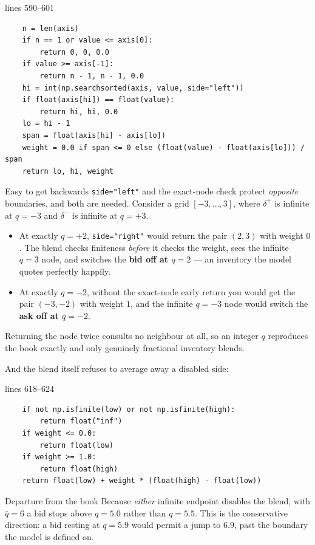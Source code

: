 \documentclass[11pt,a4paper]{article}
\newcommand{\code}[1]{\texttt{\small #1}}
\newcommand{\snip}[3]{%
  \par\addvspace{6pt}\noindent
  {\footnotesize\color{NavyLink}\texttt{\detokenize{#1}}\quad lines #2--#3}%
  \par\nobreak\vspace{1pt}}
\begin{document}
\snip{scripts/mm_core.py}{590}{601}
\begin{lstlisting}
    n = len(axis)
    if n == 1 or value <= axis[0]:
        return 0, 0, 0.0
    if value >= axis[-1]:
        return n - 1, n - 1, 0.0
    hi = int(np.searchsorted(axis, value, side="left"))
    if float(axis[hi]) == float(value):
        return hi, hi, 0.0
    lo = hi - 1
    span = float(axis[hi] - axis[lo])
    weight = 0.0 if span <= 0 else (float(value) - float(axis[lo])) / span
    return lo, hi, weight
\end{lstlisting}

\begin{trap}{Easy to get backwards}
\code{side="left"} and the exact-node check protect \emph{opposite} boundaries,
and both are needed. Consider a grid $[-3,\dots,3]$, where $\delta^{+}$ is
infinite at $q=-3$ and $\delta^{-}$ is infinite at $q=+3$.
\begin{itemize}[nosep]
  \item At exactly $q=+2$, \code{side="right"} would return the pair $(2,3)$ with
    weight $0$. The blend checks finiteness \emph{before} it checks the weight,
    sees the infinite $q=3$ node, and switches the \textbf{bid off at $q=2$} ---
    an inventory the model quotes perfectly happily.
  \item At exactly $q=-2$, without the exact-node early return you would get the
    pair $(-3,-2)$ with weight $1$, and the infinite $q=-3$ node would switch the
    \textbf{ask off at $q=-2$}.
\end{itemize}
Returning the node twice consults no neighbour at all, so an integer $q$
reproduces the book exactly and only genuinely fractional inventory blends.
\end{trap}

And the blend itself refuses to average away a disabled side:

\snip{scripts/mm_core.py}{618}{624}
\begin{lstlisting}
    if not np.isfinite(low) or not np.isfinite(high):
        return float("inf")
    if weight <= 0.0:
        return float(low)
    if weight >= 1.0:
        return float(high)
    return float(low) + weight * (float(high) - float(low))
\end{lstlisting}

\begin{departure}{Departure from the book}
Because \emph{either} infinite endpoint disables the blend, with $\bar{q}=6$ a
bid stops above $q = 5.0$ rather than $q = 5.5$. This is the conservative
direction: a bid resting at $q=5.9$ would permit a jump to $6.9$, past the
boundary the model is defined on.
\end{departure}
\end{document}
